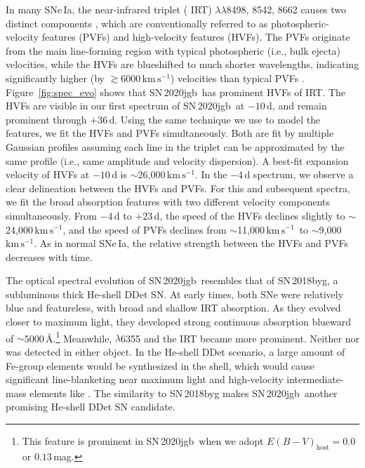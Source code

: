 \documentclass[twocolumn]{aastex631}
\newcommand{\sn}{SN\,2020jgb}
\newcommand{\kms}{$\mathrm{km}\,\mathrm{s}^{-1}$}
\begin{document}
In many SNe\,Ia, the  near-infrared triplet ( IRT) $\lambda\lambda$8498, 8542, 8662 causes two distinct components \citep{Mazzali_2005}, which are conventionally referred to as photospheric-velocity features (PVFs) and high-velocity features (HVFs). The PVFs originate from the main line-forming region with typical photospheric (i.e., bulk ejecta) velocities, while the HVFs are blueshifted to much shorter wavelengths, indicating significantly higher (by $\gtrsim$6000\,\kms) velocities than typical PVFs \citep{Silverman_HVF_2015}. Figure~\ref{fig:spec_evo} shows that \sn\ has prominent HVFs of  IRT. The HVFs are visible in our first spectrum of \sn\ at $-10$\,d, and remain prominent through $+36$\,d. Using the same technique we use to model the  features, we fit the HVFs and PVFs simultaneously. Both are fit by multiple Gaussian profiles assuming each line in the triplet can be approximated by the same profile (i.e., same amplitude and velocity dispersion). A best-fit expansion velocity of HVFs at $-10$\,d is $\sim$26,000\,\kms. In the $-4$\,d spectrum, we observe a clear delineation between the HVFs and PVFs. For this and subsequent spectra, we fit the broad absorption features with two different velocity components simultaneously. From $-4$\,d to $+23$\,d, the speed of the HVFs declines slightly to $\sim$24,000\,\kms, and the speed of PVFs declines from $\sim$11,000\,\kms\ to $\sim$9,000\,\kms. As in normal SNe\,Ia, the relative strength between the HVFs and PVFs decreases with time.

The optical spectral evolution of \sn\ resembles that of SN\,2018byg, a subluminous thick He-shell DDet SN. At early times, both SNe were relatively blue and featureless, with broad and shallow  IRT absorption. As they evolved closer to maximum light, they developed strong continuous absorption blueward of $\sim$5000\,\AA.\footnote{This feature is prominent in \sn\ when we adopt $E(B-V)_\mathrm{host} = 0.0$ or $0.13$\,mag.} Meanwhile,  $\lambda$6355 and the  IRT became more prominent. Neither  nor  was detected in either object. In the He-shell DDet scenario, a large amount of Fe-group elements would be synthesized in the shell, which would cause significant line-blanketing near maximum light \citep{Kromer_DD_2010, polin_observational_2019} and high-velocity intermediate-mass elements like  \citep{Fink_DD_2010, Kromer_DD_2010,Shen_DD_2014}. The similarity to SN\,2018byg makes \sn\ another promising He-shell DDet SN candidate.
\end{document}
